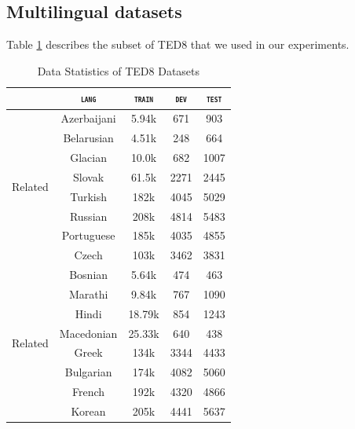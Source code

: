 \documentclass[11pt]{article}
\newcommand{\domain}[1]{\texttt{\textsc{#1}}}
\begin{document}
\subsection{Multilingual datasets}
Table \ref{tab:Corpora-multilingual} describes the subset of TED8 that we used in our experiments.
\begin{table}
  \centering
  \begin{tabular}{l|cccc} 
  \hline
    \multicolumn{1}{c|}{} & \multicolumn{1}{c}{\domain{lang}} & \multicolumn{1}{c}{\domain{train}} & \multicolumn{1}{c}{\domain{dev}} & \multicolumn{1}{c}{\domain{test}} \\
    \hline 
    \multirow{8}{*}{Related} & Azerbaijani & 5.94k & 671 & 903 \\
							 & Belarusian & 4.51k & 248 & 664 \\
							 & Glacian & 10.0k & 682 & 1007 \\
							 & Slovak & 61.5k & 2271 & 2445 \\
							 & Turkish & 182k & 4045 & 5029 \\
                             & Russian & 208k & 4814 & 5483 \\
                             & Portuguese & 185k & 4035 & 4855 \\
                             & Czech & 103k & 3462 & 3831 \\
    \hline
    \multirow{8}{*}{Related} & Bosnian & 5.64k & 474 & 463 \\
                             & Marathi & 9.84k & 767 & 1090 \\
                             & Hindi & 18.79k & 854 & 1243 \\
                             & Macedonian & 25.33k & 640 & 438 \\
                             & Greek & 134k & 3344 & 4433 \\
                             & Bulgarian & 174k & 4082 & 5060 \\
                             & French & 192k & 4320 & 4866 \\
                             & Korean & 205k & 4441 & 5637 \\
  \end{tabular}
  \caption{Data Statistics of TED8 Datasets}
\label{tab:Corpora-multilingual}
\end{table}
\end{document}
